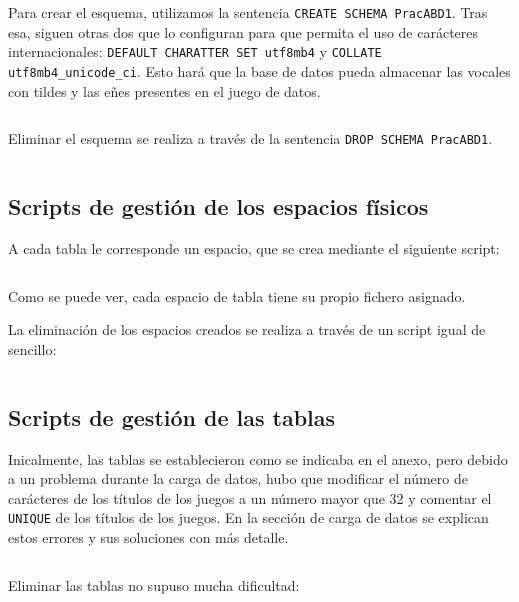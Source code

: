 \documentclass[a4paper, 11pt, oneside]{article} %
\newcommand{\scriptdir}{../scripts/} %
\begin{document}
Para crear el esquema, utilizamos la sentencia \texttt{CREATE SCHEMA PracABD1}. Tras esa, siguen otras dos que lo configuran para que permita el uso de carácteres internacionales: \texttt{DEFAULT CHARATTER SET utf8mb4} y \texttt{COLLATE utf8mb4_unicode_ci}. Esto hará que la base de datos pueda almacenar las vocales con tildes y las eñes presentes en el juego de datos.\\

\inputminted{mysql}{\scriptdir creator.sql}

Eliminar el esquema se realiza a través de la sentencia \texttt{DROP SCHEMA PracABD1}.\\

\inputminted{mysql}{\scriptdir dropper.sql}




\subsection{Scripts de gestión de los espacios físicos}

A cada tabla le corresponde un espacio, que se crea mediante el siguiente script:

\inputminted{mysql}{\scriptdir set_physical.sql}

Como se puede ver, cada espacio de tabla tiene su propio fichero asignado.

La eliminación de los espacios creados se realiza a través de un script igual de sencillo:

\inputminted{mysql}{\scriptdir drop_physical.sql}




\subsection{Scripts de gestión de las tablas}

Inicalmente, las tablas se establecieron como se indicaba en el anexo, pero debido a un problema durante la carga de datos, hubo que modificar el número de carácteres de los títulos de los juegos a un número mayor que 32 y comentar el \texttt{UNIQUE} de los títulos de los juegos. En la sección de carga de datos se explican estos errores y sus soluciones con más detalle.

\inputminted{mysql}{\scriptdir set_tables.sql}

Eliminar las tablas no supuso mucha dificultad:

\inputminted{mysql}{\scriptdir drop_tables.sql}
\end{document}
